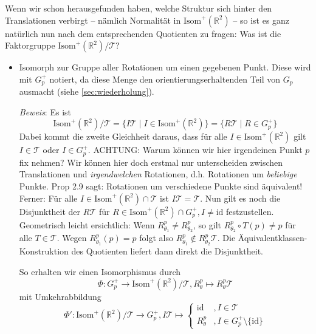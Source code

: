 \documentclass[a4paper, ngerman]{article}
\numberwithin{equation}{chapter}
\theoremstyle{plain}
\theoremstyle{definition}
\newcommand{\id}{\ensuremath{\text{id}}}
\newcommand{\geradisometr}{\ensuremath{\mathrm{Isom}^+(\mathbb R^2)}}
\newcommand{\anm}[1]{{\color{red} #1}}
\begin{document}
Wenn wir schon herausgefunden haben, welche Struktur sich hinter den Translationen verbirgt -- nämlich Normalität in \(\geradisometr\) -- so ist es ganz natürlich nun nach dem entsprechenden Quotienten zu fragen: Was ist die Faktorgruppe \(\geradisometr /\mathcal T\)? 
\begin{itemize}
    \item Isomorph zur Gruppe aller Rotationen um einen gegebenen Punkt. Diese wird mit \(G_p^+\) notiert, da diese Menge den orientierungserhaltenden Teil von \(G_p\) ausmacht (siehe \cref{sec:wiederholung}). 
    
    \textit{Beweis}: Es ist 
    \begin{equation*}
        \geradisometr/\mathcal T = \{I\mathcal{T} \mid I \in \geradisometr\} = \{R\mathcal{T} \mid R \in G_p^+\}
    \end{equation*}
    Dabei kommt die zweite Gleichheit daraus, dass für alle \(I \in \geradisometr\) gilt \(I \in \mathcal T\) oder \(I \in G_p^+\). \anm{ACHTUNG: Warum können wir hier irgendeinen Punkt \(p\) fix nehmen? Wir können hier doch erstmal nur unterscheiden zwischen Translationen und \textit{irgendwelchen} Rotationen, d.h. Rotationen um \textit{beliebige} Punkte. Prop 2.9 sagt: Rotationen um verschiedene Punkte sind äquivalent!} Ferner: Für alle \(I \in \geradisometr\cap \mathcal T\) ist \(I\mathcal T = \mathcal T\). Nun gilt es noch die Disjunktheit der \(R\mathcal T\) für \(R \in \geradisometr\cap G_p^+, I \neq \id\) festzustellen. Geometrisch leicht ersichtlich: Wenn \(R_{\theta_1}^p \neq R_{\theta_2}^p\), so gilt \(R_{\theta_2}^p\circ T(p) \neq p\) für alle \(T \in \mathcal T\). Wegen \(R_{\theta_1}^p(p) = p\) folgt also \(R_{\theta_1}^p\notin R_{\theta_2}^p \mathcal T\). Die Äquivalentklassen-Konstruktion des Quotienten liefert dann direkt die Disjunktheit. 

    So erhalten wir einen Isomorphismus durch 
    \begin{equation*}
        \Phi: G_p^+ \to \geradisometr/\mathcal T, R_{\theta}^p \mapsto R_{\theta}^p\mathcal T
    \end{equation*}
    mit Umkehrabbildung 
    \begin{equation*}
        \Phi': \geradisometr/\mathcal T \to G_p^+, I\mathcal T \mapsto 
        \begin{cases}
            \id &, I \in \mathcal T \\
            R_\theta^p &, I \in G_p^+\setminus \{\id\}
        \end{cases}
    \end{equation*}
    

\end{itemize}
\end{document}
